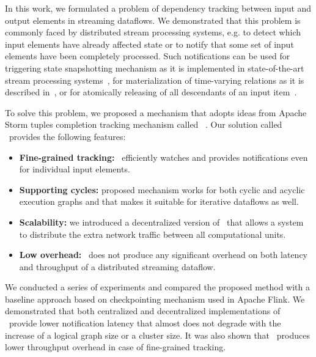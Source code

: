 \label {fs-acker-conclusion}

In this work, we formulated a problem of dependency tracking between input and output elements in streaming dataflows. We demonstrated that this problem is commonly faced by distributed stream processing systems, e.g. to detect which input elements have already affected state or to notify that some set of input elements have been completely processed. Such notifications can be used for triggering state snapshotting mechanism as it is implemented in state-of-the-art stream processing systems~\cite{Carbone:2017:SMA:3137765.3137777, apache:storm}, for materialization of time-varying relations as it is described in~\cite{Begoli:2019:OSR:3299869.3314040}, or for atomically releasing of all descendants of an input item~\cite{we2018adbis}.

To solve this problem, we proposed a mechanism that adopts ideas from Apache Storm tuples completion tracking mechanism called \acker\  . Our solution called \tracker\ provides the following features:
\begin{itemize}
    \item {\bf Fine-grained tracking:} \tracker\ efficiently watches and provides notifications even for individual input elements.
    \item {\bf Supporting cycles:} proposed mechanism works for both cyclic and acyclic execution graphs and that makes it suitable for iterative dataflows as well. 
    \item {\bf Scalability:} we introduced a decentralized version of \tracker\ that allows a system to distribute the extra network traffic between all computational units. 
    \item {\bf Low overhead:} \tracker\ does not produce any significant overhead on both latency and throughput of a distributed streaming dataflow.
\end{itemize}

We conducted a series of experiments and compared the proposed method with a baseline approach based on checkpointing mechanism used in Apache Flink. We demonstrated that both centralized and decentralized implementations of \tracker\ provide lower notification latency that almost does not degrade with the increase of a logical graph size or a cluster size. It was also shown that \tracker\ produces lower throughput overhead in case of fine-grained tracking.
